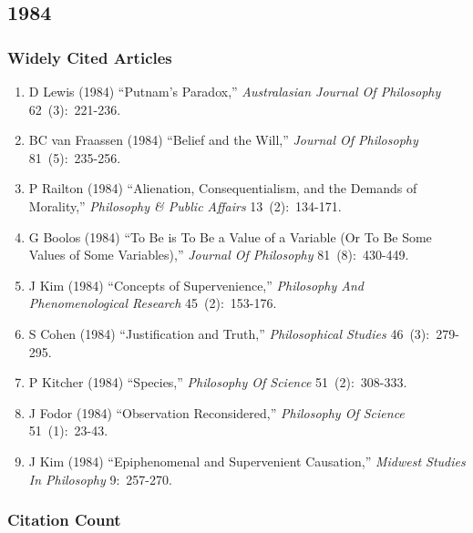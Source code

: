 \documentclass[
  10pt,
  letterpaper,
  DIV=11,
  numbers=noendperiod,
  twoside]{scrartcl}
\providecommand{\tightlist}{%
  \setlength{\itemsep}{0pt}\setlength{\parskip}{0pt}}\usepackage{longtable,booktabs,array}
\begin{document}
\newpage

\subsection{1984}\label{sec-s1984}

\subsubsection*{Widely Cited Articles}\label{widely-cited-articles-28}

\begin{enumerate}
\def\labelenumi{\arabic{enumi}.}
\tightlist
\item
  D Lewis (1984) ``Putnam's Paradox,'' \emph{Australasian Journal Of
  Philosophy} 62~(3):~221-236.
\item
  BC van Fraassen (1984) ``Belief and the Will,'' \emph{Journal Of
  Philosophy} 81~(5):~235-256.
\item
  P Railton (1984) ``Alienation, Consequentialism, and the Demands of
  Morality,'' \emph{Philosophy \& Public Affairs} 13~(2):~134-171.
\item
  G Boolos (1984) ``To Be is To Be a Value of a Variable (Or To Be Some
  Values of Some Variables),'' \emph{Journal Of Philosophy}
  81~(8):~430-449.
\item
  J Kim (1984) ``Concepts of Supervenience,'' \emph{Philosophy And
  Phenomenological Research} 45~(2):~153-176.
\item
  S Cohen (1984) ``Justification and Truth,'' \emph{Philosophical
  Studies} 46~(3):~279-295.
\item
  P Kitcher (1984) ``Species,'' \emph{Philosophy Of Science}
  51~(2):~308-333.
\item
  J Fodor (1984) ``Observation Reconsidered,'' \emph{Philosophy Of
  Science} 51~(1):~23-43.
\item
  J Kim (1984) ``Epiphenomenal and Supervenient Causation,''
  \emph{Midwest Studies In Philosophy} 9:~257-270.
\end{enumerate}

\subsubsection*{Citation Count}\label{sec-count-1984}
\end{document}
